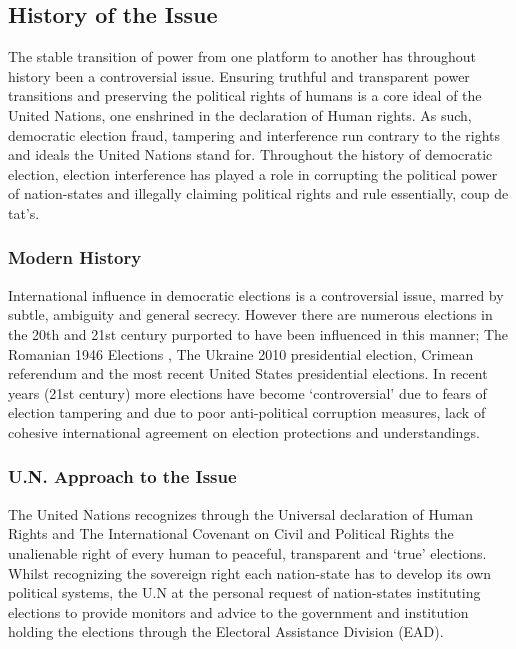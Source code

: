 \documentclass[11pt,a4paper]{report}
\begin{document}
\subsection{History of the Issue}
The stable transition of power from one platform to another has throughout history been a controversial issue. Ensuring truthful and transparent power transitions and preserving the political rights of humans is a core ideal of the United Nations, one enshrined in the declaration of Human rights. As such, democratic election fraud, tampering and interference run contrary to the rights and ideals the United Nations stand for. Throughout the history of democratic election, election interference has played a role in corrupting the political power of nation-states and illegally claiming political rights and rule essentially, coup de tat's.

\subsubsection{Modern History}

International influence in democratic elections is a controversial issue, marred by subtle, ambiguity and general secrecy. However there are numerous elections in the 20th and 21st century purported to have been influenced in this manner; The Romanian 1946 Elections , The Ukraine 2010 presidential election, Crimean referendum and the most recent United States presidential elections. In recent years (21st century) more elections have become `controversial' due to fears of election tampering and due to poor anti-political corruption measures, lack of cohesive international agreement on election protections and understandings. 

\subsubsection{U.N. Approach to the Issue}

The United Nations recognizes through the Universal declaration of Human Rights and The International Covenant on Civil and Political Rights the unalienable right of every human to peaceful, transparent and `true' elections. Whilst recognizing the sovereign right each nation-state has to develop its own political systems, the U.N at the personal request of nation-states instituting elections to provide monitors and advice to the government and institution holding the elections through the Electoral Assistance Division (EAD).
\end{document}
